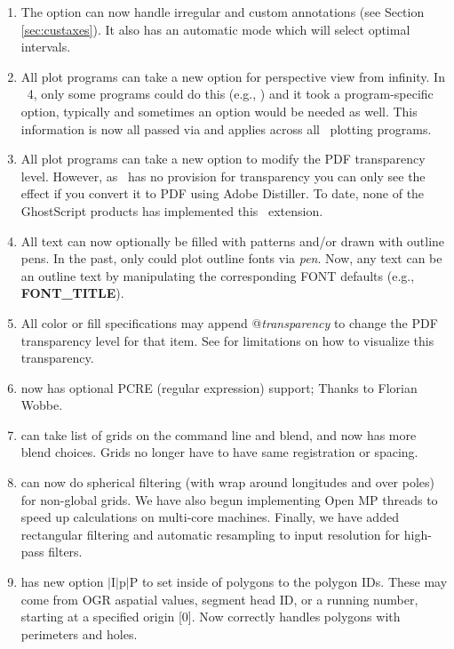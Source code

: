 \begin{enumerate}
	\item The  option can now handle irregular and custom annotations (see Section \ref{sec:custaxes}).
		It also has an automatic mode which will select optimal intervals.
	\item All plot programs can take a new  option for perspective view from infinity.  In \GMT\ 4, only some
		programs could do this (e.g., ) and it took a program-specific option, typically  and
		sometimes an option  would be needed as well.  This information is now all passed via  and
		applies across all \GMT\ plotting programs.
	\item All plot programs can take a new  option to modify the PDF transparency level.  However, as \PS\ has
		no provision for transparency you can only see the effect if you convert it to PDF using Adobe Distiller.
		To date, none of the GhostScript products has implemented this \PS\ extension.
	\item All text can now optionally be filled with patterns and/or drawn with outline pens.  In the past, only
		 could plot outline fonts via \emph{pen}.  Now, any text can be an outline text
		by manipulating the corresponding FONT defaults (e.g., \textbf{FONT\_TITLE}).
	\item All color or fill specifications may append @\emph{transparency} to change the PDF transparency level for that item.
		See  for limitations on how to visualize this transparency.
	\item {} now has optional PCRE (regular expression) support; Thanks to Florian Wobbe.
	\item {} can take list of grids on the command line and blend, and now has more blend choices.  Grids no
		longer have to have same registration or spacing.
	\item {} can now do spherical filtering (with wrap around longitudes and over poles) for non-global grids.
		We have also begun implementing Open MP threads to speed up calculations on multi-core machines.  Finally, we have
		added rectangular filtering and automatic resampling to input resolution for high-pass filters.
	\item {} has new option $|$I$|$p$|$P to set inside of polygons to the polygon IDs.
		These may come from OGR aspatial values, segment head ID,
		or a running number, starting at a specified origin [0].
		Now correctly handles polygons with perimeters and holes.

\end{enumerate}
